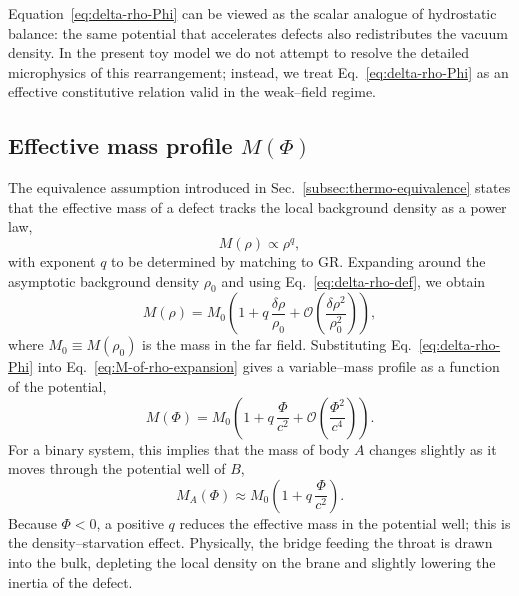 \documentclass[11pt]{article}
\begin{document}
Equation~\eqref{eq:delta-rho-Phi} can be viewed as the scalar analogue of
hydrostatic balance: the same potential that accelerates defects also
redistributes the vacuum density.  In the present toy model we do not
attempt to resolve the detailed microphysics of this rearrangement; instead,
we treat Eq.~\eqref{eq:delta-rho-Phi} as an effective constitutive relation
valid in the weak--field regime.

\subsection{Effective mass profile \texorpdfstring{\(M(\Phi)\)}{M(Phi)}}
\label{subsec:scalar-MPhi}

The equivalence assumption introduced in
Sec.~\ref{subsec:thermo-equivalence} states that the effective mass of a
defect tracks the local background density as a power law,
\begin{equation}
  M(\rho) \propto \rho^q,
  \label{eq:mass-density-scaling-repeat}
\end{equation}
with exponent \(q\) to be determined by matching to GR.  Expanding around
the asymptotic background density \(\rho_0\) and using
Eq.~\eqref{eq:delta-rho-def}, we obtain
\begin{equation}
  M(\rho)
  = M_0 \left( 1 + q\,\frac{\delta \rho}{\rho_0}
    + \mathcal{O}\!\left( \frac{\delta \rho^2}{\rho_0^2} \right) \right),
  \label{eq:M-of-rho-expansion}
\end{equation}
where \(M_0 \equiv M(\rho_0)\) is the mass in the far field.  Substituting
Eq.~\eqref{eq:delta-rho-Phi} into Eq.~\eqref{eq:M-of-rho-expansion} gives a
variable--mass profile as a function of the potential,
\begin{equation}
  M(\Phi)
  = M_0 \left( 1 + q\,\frac{\Phi}{c^2}
    + \mathcal{O}\!\left( \frac{\Phi^2}{c^4} \right) \right).
  \label{eq:M-of-Phi}
\end{equation}
For a binary system, this implies that the mass of body \(A\) changes
slightly as it moves through the potential well of \(B\),
\begin{equation}
  M_A(\Phi)
  \approx M_0 \left( 1 + q\,\frac{\Phi}{c^2} \right).
  \label{eq:MA-of-Phi}
\end{equation}
Because \(\Phi < 0\), a positive \(q\) reduces the effective mass in the
potential well; this is the density--starvation effect.  Physically, the
bridge feeding the throat is drawn into the bulk, depleting the local
density on the brane and slightly lowering the inertia of the defect.
\end{document}

